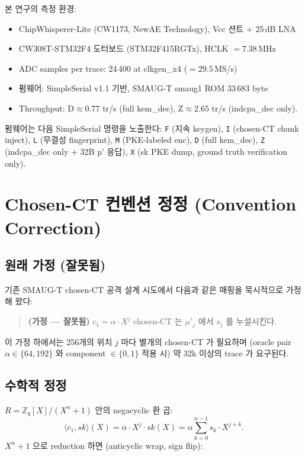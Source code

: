 \documentclass[11pt]{article}
\theoremstyle{plain}
\theoremstyle{definition}
\theoremstyle{remark}
\newcommand{\Zq}{\mathbb{Z}_q}
\begin{document}
본 연구의 측정 환경:

\begin{itemize}[leftmargin=*]
\item ChipWhisperer-Lite (CW1173, NewAE Technology), Vcc 션트 + 25\,dB LNA
\item CW308T-STM32F4 도터보드 (STM32F415RGTx), HCLK $= 7.38$\,MHz
\item ADC samples per trace: 24\,400 at clkgen\_x4 ($= 29.5$\,MS/s)
\item 펌웨어: SimpleSerial v1.1 기반, SMAUG-T smaug1 ROM 33\,683 byte
\item Throughput: $\mathrm{D} \approx 0.77$ tr/s (full kem\_dec),
   $\mathrm{Z} \approx 2.65$ tr/s (indcpa\_dec only).
\end{itemize}

펌웨어는 다음 SimpleSerial 명령을 노출한다: \texttt{F} (지속 keygen),
\texttt{I} (chosen-CT chunk inject), \texttt{L} (무결성 fingerprint),
\texttt{M} (PKE-labeled enc), \texttt{D} (full kem\_dec),
\texttt{Z} (indcpa\_dec only $+$ 32B µ' 응답), \texttt{X} (sk PKE dump,
ground truth verification only).

\section{Chosen-CT 컨벤션 정정 (Convention Correction)}
\label{sec:convention}

\subsection{원래 가정 (잘못됨)}

기존 SMAUG-T chosen-CT 공격 설계 시도에서 다음과 같은 매핑을 묵시적으로 가정해
왔다:
\begin{quote}
\textbf{(가정 — 잘못됨)} $c_1 = \alpha \cdot X^j$ chosen-CT 는 $\mu'_j$ 에서
$s_j$ 를 누설시킨다.
\end{quote}
이 가정 하에서는 256개의 위치 $j$ 마다 별개의 chosen-CT 가 필요하며 (oracle
pair $\alpha \in \{64, 192\}$ 와 component $\in \{0,1\}$ 적용 시) 약 $32$k 이상의
trace 가 요구된다.

\subsection{수학적 정정}

$R = \Zq[X]/(X^n+1)$ 안의 negacyclic 환 곱:
\begin{equation}
\langle c_1, sk \rangle(X) = \alpha \cdot X^j \cdot sk(X) =
   \alpha \sum_{k=0}^{n-1} s_k \cdot X^{j+k}.
\label{eq:rawmul}
\end{equation}
$X^n + 1$ 으로 reduction 하면 (anticyclic wrap, sign flip):
\end{document}
